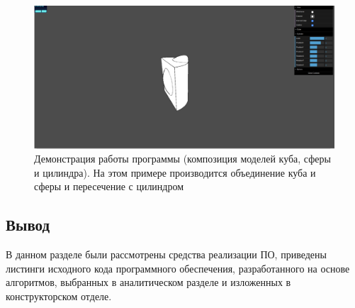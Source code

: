 \begin{figure}[h]
	\centering
	\captionsetup{justification=centering}
	\includegraphics[width=160mm]{img/example.png}
	\caption{Демонстрация  работы  программы  (композиция  моделей 
		куба, сферы и цилиндра). На этом примере производится  объединение куба и 
		сферы и пересечение с цилиндром}
	\label{fig:example}
\end{figure}


\subsection*{Вывод}
В данном разделе были рассмотрены средства реализации ПО, приведены 
листинги исходного кода программного обеспечения, разработанного на основе 
алгоритмов,  выбранных  в  аналитическом  разделе  и  изложенных  в 
конструкторском отделе.

\pagebreak
